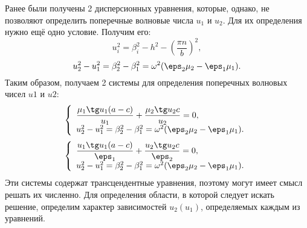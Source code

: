 \documentclass[12pt]{hedsemwork}
\renewcommand{\frac}{\dfrac}
\begin{document}
\newpage
\begin{appendix}
Ранее были получены 2 дисперсионных уравнения, которые, однако, не позволяют
определить поперечные волновые числа \( u_1 \) и \( u_2 \). Для их определения
нужно ещё одно условие. Получим его:
\[
    u_i^2 = \beta_i^2 - h^2 - \left(\frac{\pi n}{b}\right)^2,
\]
\[
    u_2^2 - u_1^2 = \beta_2^2 - \beta_1^2 = \omega^2(\eps_2\mu_2 - \eps_1\mu_1).
\]
Таким образом, получаем 2 системы для определения поперечных волновых чисел
\( u1 \) и \( u2 \):
\[
    \left\{
        \begin{array}{l}
            \frac{\mu_1\tg u_1 (a-c)}{u_1} + \frac{\mu_2\tg u_2 c}{u_2} = 0,\\
            u_2^2 - u_1^2 = \beta_2^2 - \beta_1^2 =
            \omega^2(\eps_2\mu_2 - \eps_1\mu_1).
        \end{array}
    \right.
\]
\[
    \left\{
        \begin{array}{l}
            \frac{u_1\tg u_1 (a-c)}{\eps_1} + \frac{u_2\tg u_2 c}{\eps_2} = 0,\\
            u_2^2 - u_1^2 = \beta_2^2 - \beta_1^2 =
            \omega^2(\eps_2\mu_2 - \eps_1\mu_1).
        \end{array}
    \right.
\]
Эти системы содержат трансцендентные уравнения, поэтому могут имеет смысл
решать их численно. Для определения области, в которой следует искать решение,
определим характер зависимостей \( u_2(u_1) \), определяемых каждым из уравнений.


\end{appendix}
\end{document}
